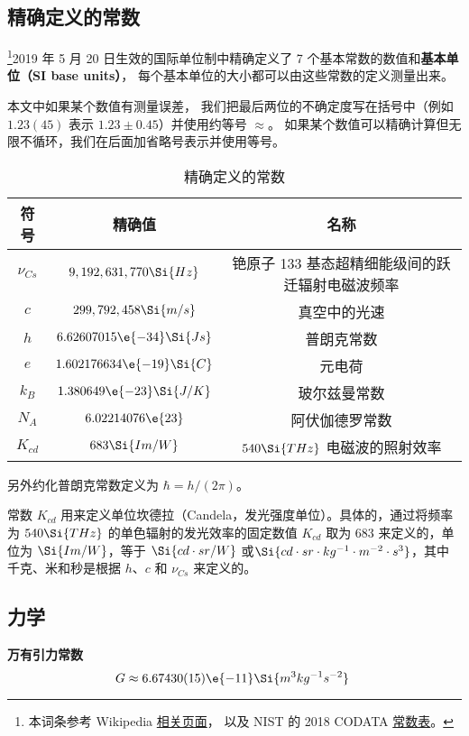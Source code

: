 

\subsection{精确定义的常数}
\footnote{本词条参考 Wikipedia \href{https://en.wikipedia.org/wiki/Physical_constant}{相关页面}， 以及 NIST 的 2018 CODATA \href{https://physics.nist.gov/cuu/Constants/Table/allascii.txt}{常数表}。}2019 年 5 月 20 日生效的国际单位制中精确定义了 7 个基本常数的数值和\textbf{基本单位（SI base units）}， 每个基本单位的大小都可以由这些常数的定义测量出来。

本文中如果某个数值有测量误差， 我们把最后两位的不确定度写在括号中（例如 $1.23(45)$ 表示 $1.23 \pm 0.45$）并使用约等号 $\approx$。 如果某个数值可以精确计算但无限不循环，我们在后面加省略号表示并使用等号。
\begin{table}[ht]
\centering
\caption{精确定义的常数}\label{tab_Consts_1}
\begin{tabular}{|c|c|c|}
\hline
符号 & 精确值 & 名称 \\
\hline
$\nu_{Cs}$ & $9,192,631,770\Si{Hz}$ & 铯原子 133 基态超精细能级间的跃迁辐射电磁波频率 \\
\hline
$c$ & $299,792,458\Si{m/s}$ & 真空中的光速 \\
\hline
$h$ & $6.62607015\e{-34}\Si{Js}$ & 普朗克常数 \\
\hline
$e$ & $1.602176634\e{-19}\Si{C} $ & 元电荷 \\
\hline
$k_B$ & $1.380649\e{-23} \Si{J/K}$ & 玻尔兹曼常数 \\
\hline
$N_A$ & $6.02214076\e{23} $ & 阿伏伽德罗常数 \\
\hline
$K_{cd}$ & $683\Si{Im/W}$ & $540\Si{THz}$ 电磁波的照射效率 \\
\hline
\end{tabular}
\end{table}
另外约化普朗克常数定义为 $\hbar = h/(2\pi)$。

常数 $K_{cd}$ 用来定义单位坎德拉（Candela，发光强度单位）。具体的，通过将频率为 $540 \Si{THz}$ 的单色辐射的发光效率的固定数值 $K_{cd}$ 取为 $683$ 来定义的，单位为 $\Si{Im/W}$，等于 $\Si{cd\cdot sr/W}$ 或$ \Si{cd\cdot sr\cdot kg^{-1} \cdot m^{-2}\cdot s^3}$，其中千克、米和秒是根据 $h$、$c$ 和 $\nu_{Cs}$ 来定义的。

\subsection{力学}
\textbf{万有引力常数}
\begin{equation}
G \approx 6.67430(15)\e{-11} \Si{m^3 kg^{-1} s^{-2}}~
\end{equation}

